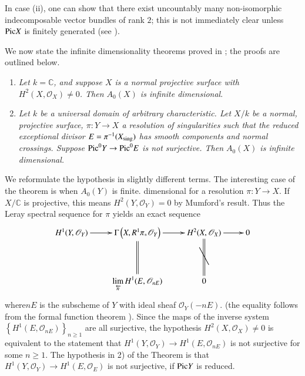 In case (ii), one can show that there exist uncountably many non-isomorphic indecomposable vector bundles of rank $2$; this is not immediately clear unless $\mathrm{Pic}  X$ is finitely generated (see \cite{Srinivase}). 

We now state the infinite dimensionality theorems proved in \cite{Srinivasb}; the proofs are outlined below. 

\begin{thm1}
\begin{enumerate}
\renewcommand{\labelenumi}{(\theenumi)}
\item \textit{Let $k=\mathbb{C}$, and suppose $X$ is a normal projective surface with $H^{2}(X,\mathscr{O}_X)\neq 0$. Then $A_0(X)$ is infinite dimensional}.

\item \textit{Let $k$ be a universal domain of arbitrary characteristic. Let $X/k$ be a normal, projective surface, $\pi:Y\to X$ a resolution of singularities such that the reduced exceptional divisor $E=\pi^{-1}(X_{\mathrm{sing}})$ has smooth components and normal crossings. Suppose $\mathrm{Pic}^{0} Y\to \mathrm{Pic}^{0} E$ is not surjective. Then $A_0(X)$ is infinite dimensional.}
\end{enumerate}
\end{thm1}

We reformulate the hypothesis in slightly different terms. The interesting case of the theorem is when $A_0(Y)$ is finite. dimensional for a resolution $\pi: Y\to X$. If $X/\mathbb{C}$ is projective, this means $H^{2}(Y,\mathscr{O}_Y)=0$ by Mumford's result. Thus the Leray spectral sequence for $\pi$ yields an exact sequence 
$$
\xymatrix@R=.1cm{H^{1}(Y,\mathscr{O}_Y) \ar[r] & \Gamma \left(X,\ar@{=}[dd] R^{1}\pi_{\ast}\mathscr{O}_Y\right)\ar[r]&H^{2}(X,\ar@{=}[dd]\mathscr{O}_X)\ar[r]&0\\
 & & \rotatebox{20}{$\Bigg\backslash$} &\\
&\displaystyle\mathop{\lim}_{\overleftarrow{n}}H^{1}(E, \mathscr{O}_{n E}) &0}
$$
where\pageoriginale $n E$ is the subscheme of $Y$ with ideal sheaf $\mathscr{O}_Y(-nE)$. (the equality follows from the formal function theorem \cite{Hartshorne}). Since the maps of the inverse system $\left\{H^{1}(E, \mathscr{O}_{n E})\right\}_{n \geq 1}$ are all surjective, the hypothesis $H^{2}(X, \mathscr{O}_X)\neq 0$ is equivalent to the statement that $H^{1}(Y, \mathscr{O}_Y)\to H^{1}(E, \mathscr{O}_{n E})$ is not surjective for some $n\geq 1$. The hypothesis in 2) of the Theorem is that $H^{1}(Y,\mathscr{O}_Y)\to H^{1}(E, \mathscr{O}_E)$ is not surjective, if $\mathrm{Pic} Y$ is reduced. 

